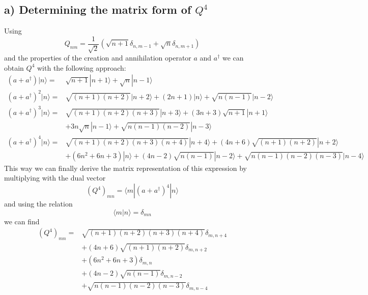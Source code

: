 \documentclass[12pt,a4paper]{article}
\begin{document}
\subsection*{a) Determining the matrix form of $Q^4$}
Using
\begin{equation}
Q_{nm}=\frac{1}{\sqrt{2}}\left(\sqrt{n+1}\delta_{n,m-1}+\sqrt{n}\delta_{n,m+1}\right)
\end{equation}
and the properties of the creation and annihilation operator $a$ and $a^{\dagger}$ we can obtain $Q^4$ with the following approach:
\begin{align*}
(a+a^{\dagger})|n\rangle=&\sqrt{n+1}|n+1\rangle+\sqrt{n}|n-1\rangle\\
(a+a^{\dagger})^2|n\rangle=&\sqrt{(n+1)(n+2)}|n+2\rangle+(2n+1)|n\rangle+\sqrt{n(n-1)}|n-2\rangle\\
(a+a^{\dagger})^3|n\rangle=&\sqrt{(n+1)(n+2)(n+3)}|n+3\rangle+(3n+3)\sqrt{n+1}|n+1\rangle\\
&+3n\sqrt{n}|n-1\rangle+\sqrt{n(n-1)(n-2)}|n-3\rangle\\
(a+a^{\dagger})^4|n\rangle=&\sqrt{(n+1)(n+2)(n+3)(n+4)}|n+4\rangle+(4n+6)\sqrt{(n+1)(n+2)}|n+2\rangle\\
&+(6n^2+6n+3)|n\rangle+(4n-2)\sqrt{n(n-1)}|n-2\rangle+\sqrt{n(n-1)(n-2)(n-3)}|n-4\rangle
\end{align*}
This way we can finally derive the matrix representation of this expression by multiplying with the dual vector
\begin{equation}
(Q^4)_{mn}=\langle m|(a+a^{\dagger})^4|n\rangle
\end{equation}
and using the relation
\begin{equation}
\langle m|n\rangle=\delta_{mn}
\end{equation}
we can find
\begin{align}
(Q^4)_{mn}=&\sqrt{(n+1)(n+2)(n+3)(n+4)}\delta_{m,n+4}\\
&+(4n+6)\sqrt{(n+1)(n+2)}\delta_{m,n+2}\\
&+(6n^2+6n+3)\delta_{m,n}\\
&+(4n-2)\sqrt{n(n-1)}\delta_{m,n-2}\\
&+\sqrt{n(n-1)(n-2)(n-3)}\delta_{m,n-4}
\end{align}
\end{document}
